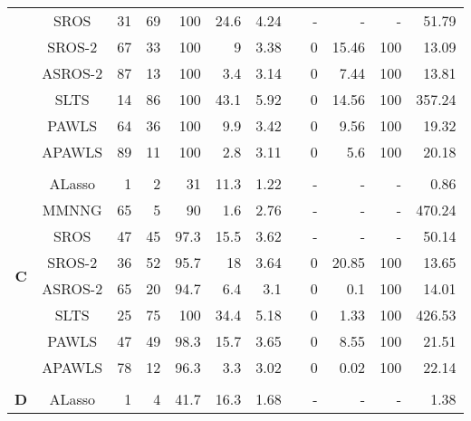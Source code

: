 \documentclass{article}\usepackage[]{graphicx}\usepackage[]{color}
\begin{document}
\begin{table}[thp]
\begin{center}
\begin{tabular}{ccrrrrrrrrrr}
	      & SROS & 31 & 69 & 100 
	      & 24.6 & 4.24 & & -& - & - &  51.79\\
	      
	       & SROS-2 & 67 & 33 & 100 
	      & 9 & 3.38 & & 0 
	      & 15.46 & 100 & 13.09\\
	      
	      & ASROS-2 & 87 & 13 & 100 
	      & 3.4 & 3.14 & & 0 
	      & 7.44 & 100 & 13.81\\
	      
	      
	       & SLTS & 14 & 86 & 100 
	      & 43.1 & 5.92 & & 0 
	      & 14.56 & 100 & 357.24\\
	      
	      & PAWLS & 64 & 36 & 100 
	      & 9.9 & 3.42 & & 0 
	      & 9.56 & 100 & 19.32\\
	      
	      & APAWLS & 89 & 11 & 100 
	      & 2.8 & 3.11 & & 0 
	      & 5.6 & 100 & 20.18\\
	      \\
	        	  \multirow{8}{*}{{\bf C}}
	       & ALasso & 1 & 2 & 31 
	      & 11.3 & 1.22 & & -& - & - &  0.86\\
	      
	      & MMNNG & 65 & 5 & 90 
	      & 1.6 & 2.76 & & -& - & - & 470.24\\
	      
	      & SROS & 47 & 45 & 97.3 
	      & 15.5 & 3.62 & & -& - & - &  50.14\\
	      
	       & SROS-2 & 36 & 52 & 95.7 
	      & 18 & 3.64 & & 0 
	      & 20.85 & 100 & 13.65\\
	      
	      & ASROS-2 & 65 & 20 & 94.7 
	      & 6.4 & 3.1 & & 0 
	      & 0.1 & 100 & 14.01\\
	      
	      
	       & SLTS & 25 & 75 & 100 
	      & 34.4 & 5.18 & & 0 
	      & 1.33 & 100 & 426.53\\
	      
	      & PAWLS & 47 & 49 & 98.3 
	      & 15.7 & 3.65 & & 0 
	      & 8.55 & 100 & 21.51\\
	      
	      & APAWLS & 78 & 12 & 96.3 
	      & 3.3 & 3.02 & & 0 
	      & 0.02 & 100 & 22.14\\
	      
	     \\
	       	  \multirow{8}{*}{{\bf D}}
	      & ALasso & 1 & 4 & 41.7 
	      & 16.3 & 1.68 & & -& - & - &  1.38\\
	      

\end{tabular}
\end{center}
\end{table}
\end{document}
